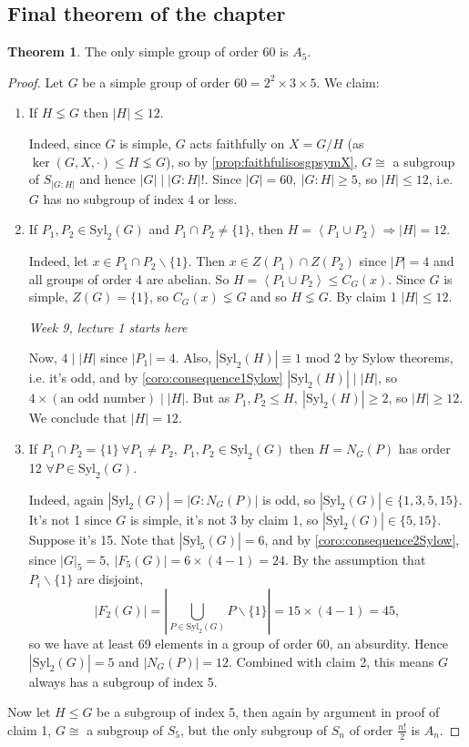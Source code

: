 \documentclass[a4paper]{article}
\newcommand{\la}{\left\langle}
\newcommand{\ra}{\right\rangle}
\newcommand{\Syl}{\text{Syl}}
\newcommand{\Mod}{\text{ mod }}
\theoremstyle{definition}
\newtheorem{thm}[defn]{Theorem}
\begin{document}
\subsection{Final theorem of the chapter}

\begin{thm}
The only simple group of order 60 is $A_5$.
\end{thm}
\begin{proof}
Let $G$ be a simple group of order $60=2^2\times3\times5$. We claim:
\begin{enumerate}
\item If $H\lneq G$ then $|H|\leq 12$.

Indeed, since $G$ is simple, $G$ acts faithfully on $X=G/H$ (as $\ker(G,X,\cdot)\leq H\lneq G$), so by \ref{prop:faithfulisosgpsymX}, $G\cong$ a subgroup of $S_{|G:H|}$ and hence $|G|\mid |G:H|!$. Since $|G|=60,\ |G:H|\geq 5$, so $|H|\leq 12$, i.e. $G$ has no subgroup of index 4 or less.
\item If $P_1,P_2\in\Syl_2(G)$ and $P_1\cap P_2\neq \{1\}$, then $H=\la P_1\cup P_2\ra\Rightarrow |H|=12$.

Indeed, let $x\in P_1\cap P_2\backslash\{1\}$. Then $x\in Z(P_1)\cap Z(P_2)$ since $|P|=4$ and all groups of order 4 are abelian. So $H=\la P_1\cup P_2\ra \leq C_G(x)$. Since $G$ is simple, $Z(G)=\{1\}$, so $C_G(x)\lneq G$ and so $H\lneq G$. By claim 1 $|H|\leq 12$.

\begin{flushright}
\textit{Week 9, lecture 1 starts here}
\end{flushright}

Now, $4\mid |H|$ since $|P_1|=4$. Also, $|\Syl_2(H)|\equiv 1\Mod 2$ by Sylow theorems, i.e. it's odd, and by \ref{coro:consequence1Sylow} $|\Syl_2(H)|\mid |H|$, so $4\times(\text{an odd number})\mid |H|$. But as $P_1,P_2\leq H,\ |\Syl_2(H)|\geq 2$, so $|H|\geq 12$. We conclude that $|H|=12$.
\item If $P_1\cap P_2=\{1\} \ \forall P_1\neq P_2,\ P_1,P_2\in\Syl_2(G)$ then $H=N_G(P)$ has order 12 $\forall P\in\Syl_2(G)$.

Indeed, again $|\Syl_2(G)|=|G:N_G(P)|$ is odd, so $|\Syl_2(G)|\in\{1,3,5,15\}$. It's not 1 since $G$ is simple, it's not 3 by claim 1, so $|\Syl_2(G)|\in\{5,15\}$. Suppose it's 15. Note that $|\Syl_5(G)|=6$, and by \ref{coro:consequence2Sylow}, since $|G|_5=5,\ |F_5(G)|=6\times(4-1)=24$. By the assumption that $P_i\backslash\{1\}$ are disjoint,
\[
|F_2(G)|=\left|\bigcup_{P\in\Syl_2(G)} P\backslash \{1\}\right|=15\times(4-1)=45,
\]
so we have at least 69 elements in a group of order 60, an absurdity. Hence $|\Syl_2(G)|=5$ and $|N_G(P)|=12$. Combined with claim 2, this means $G$ always has a subgroup of index 5.
\end{enumerate}
Now let $H\leq G$ be a subgroup of index 5, then again by argument in proof of claim 1, $G\cong$ a subgroup of $S_5$, but the only subgroup of $S_n$ of order $\frac{n!}{2}$ is $A_n$.
\end{proof}
\end{document}
